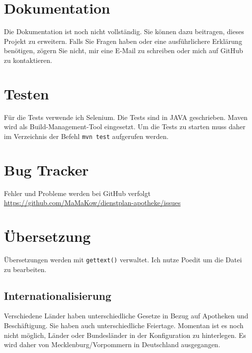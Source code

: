 \section{Dokumentation}
Die Dokumentation ist noch nicht vollständig.
Sie können dazu beitragen, dieses Projekt zu erweitern.
Falls Sie Fragen haben oder eine ausführlichere Erklärung benötigen, zögern Sie nicht, mir eine E-Mail zu schreiben oder mich auf GitHub zu kontaktieren.

\section{Testen}
Für die Tests verwende ich Selenium. Die Tests sind in JAVA geschrieben.
Maven wird als Build-Management-Tool eingesetzt.
Um die Tests zu starten muss daher im Verzeichnis  der Befehl \lstinline|mvn test| aufgerufen werden.

\section{Bug Tracker}
Fehler und Probleme werden bei GitHub verfolgt
\url{https://github.com/MaMaKow/dienstplan-apotheke/issues}


\section{Übersetzung}
Übersetzungen werden mit \lstinline|gettext()| verwaltet.
Ich nutze Poedit um die Datei  zu bearbeiten.

\subsection{Internationalisierung}
Verschiedene Länder haben unterschiedliche Gesetze in Bezug auf Apotheken
und Beschäftigung.
Sie haben auch unterschiedliche Feiertage.
Momentan ist es noch nicht möglich, Länder oder Bundesländer in der Konfiguration zu hinterlegen.
Es wird daher von Mecklenburg/Vorpommern in Deutschland ausgegangen.

